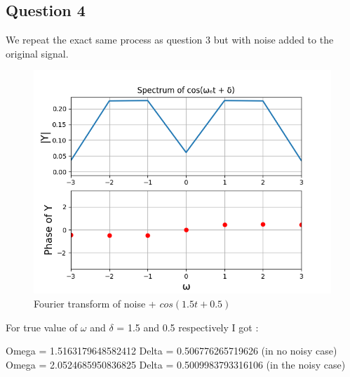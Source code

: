\documentclass{article}
\begin{document}
\subsection{Question 4}
We repeat the exact same process as question 3 but with noise added to the original signal.
\begin{figure}[h!]
\centering
\includegraphics[scale=0.6]{q4.png}
\caption{Fourier transform of noise + $cos(1.5t+0.5)$}
\label{fig:universe}
\end{figure}

For true value of $\omega$ and $\delta$ = 1.5 and 0.5 respectively 
I got :

Omega = 1.5163179648582412\newline
Delta = 0.506776265719626 (in no noisy case)\newline
Omega = 2.0524685950836825\newline
Delta = 0.5009983793316106 (in the noisy case)
\end{document}
